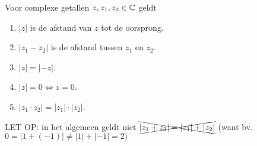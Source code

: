 \documentclass{ximera}
\begin{document}
\begin{proposition}\label{eig:complexe_modulus}
	Voor complexe getallen $z,z_1,z_2\in \mathbb{C}$ geldt
	\begin{enumerate}
		\item $|z|$ is de afstand van $z$ tot de oorsprong.
		\item $|z_1-z_2|$ is de afstand tussen $z_1$ en $z_2$.
		\item $|z|= |-z|$.		
		\item $|z|=0 \iff  z=0 $.
		\item $|z_1\cdot z_2| = |z_1| \cdot |z_2|$.
		
		
	\end{enumerate}
	LET OP: in het algemeen geldt niet $\xcancel{|z_1+z_2| = |z_1|+|z_2|}$ (want bv. $0= |1+(-1)| \neq |1|+|-1| = 2)$
	
\end{proposition}

\end{document}
